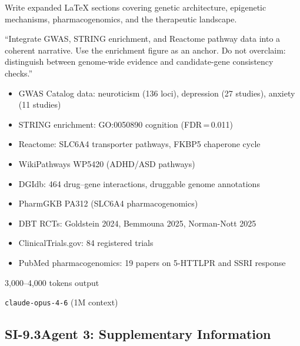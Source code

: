 \begin{description}[style=nextline, nosep]
  \item[Assignment]
    Write expanded \LaTeX{} sections covering genetic architecture, epigenetic
    mechanisms, pharmacogenomics, and the therapeutic landscape.
  \item[Key directive]
    ``Integrate GWAS, STRING enrichment, and Reactome pathway data into a
    coherent narrative.  Use the enrichment figure as an anchor.  Do not
    overclaim: distinguish between genome-wide evidence and candidate-gene
    consistency checks.''
  \item[Evidence provided]
    \begin{itemize}[nosep]
      \item GWAS Catalog data: neuroticism (136 loci), depression (27 studies),
            anxiety (11 studies)
      \item STRING enrichment: GO:0050890 cognition (FDR\,=\,0.011)
      \item Reactome: SLC6A4 transporter pathways, FKBP5 chaperone cycle
      \item WikiPathways WP5420 (ADHD/ASD pathways)
      \item DGIdb: 464 drug--gene interactions, druggable genome annotations
      \item PharmGKB PA312 (SLC6A4 pharmacogenomics)
      \item DBT RCTs: Goldstein 2024, Bemmouna 2025, Norman-Nott 2025
      \item ClinicalTrials.gov: 84 registered trials
      \item PubMed pharmacogenomics: 19 papers on 5-HTTLPR and SSRI response
    \end{itemize}
  \item[Approximate token budget] 3,000--4,000 tokens output
  \item[Model] \texttt{claude-opus-4-6} (1M context)
\end{description}

\subsection*{SI-9.3\quad Agent 3: Supplementary Information}

